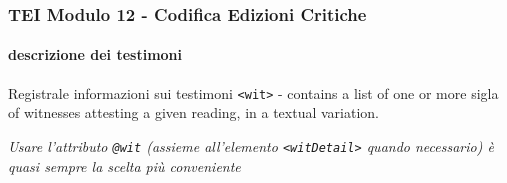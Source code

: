 \begin{frame}
    \frametitle{TEI Modulo 12 - Codifica Edizioni Critiche}
    \framesubtitle{descrizione dei testimoni}
    \addtocounter{nframe}{1}


    \begin{block}{Registrale informazioni sui testimoni}
        \texttt{<wit>} \textit{} - contains a list of one or more sigla of witnesses attesting a given reading, in a textual variation.
    \end{block}

    \begin{center}
        \textit{Usare l'attributo \texttt{@wit} (assieme all'elemento \texttt{<witDetail>} quando necessario) è quasi sempre la scelta più conveniente}
    \end{center}
    

\end{frame}

